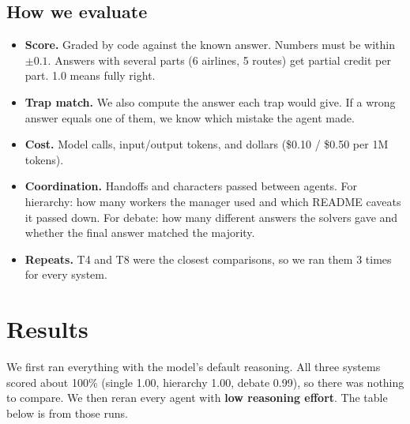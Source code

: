 \documentclass[10pt]{article}
\begin{document}
\subsection{How we evaluate}
\begin{itemize}
\item \textbf{Score.} Graded by code against the known answer. Numbers must be within $\pm0.1$. Answers with
  several parts (6 airlines, 5 routes) get partial credit per part. 1.0 means fully right.
\item \textbf{Trap match.} We also compute the answer each trap would give. If a wrong answer equals one of them,
  we know which mistake the agent made.
\item \textbf{Cost.} Model calls, input/output tokens, and dollars (\$0.10 / \$0.50 per 1M tokens).
\item \textbf{Coordination.} Handoffs and characters passed between agents. For hierarchy: how many workers the
  manager used and which README caveats it passed down. For debate: how many different answers the solvers gave
  and whether the final answer matched the majority.
\item \textbf{Repeats.} T4 and T8 were the closest comparisons, so we ran them 3 times for every system.
\end{itemize}

\section{Results}

We first ran everything with the model's default reasoning. All three systems scored about 100\% (single 1.00,
hierarchy 1.00, debate 0.99), so there was nothing to compare. We then reran every agent with \textbf{low
reasoning effort}. The table below is from those runs.
\end{document}
